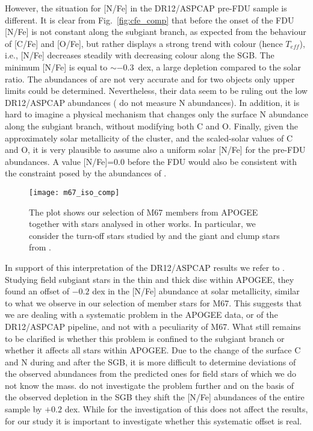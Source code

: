 \documentclass[a4paper,fleqn,usenatbib]{mnras}
\begin{document}
However, the situation for [N/Fe] in the DR12/ASPCAP pre-FDU sample is different. It is clear from Fig.~\ref{fig:cfe_comp} that before the onset of the FDU [N/Fe] is not constant along the subgiant branch, as expected from the behaviour of [C/Fe] and [O/Fe], 
but rather displays a strong trend with colour (hence $T_{eff}$), i.e., [N/Fe] decreases steadily with decreasing colour along the SGB. The minimum [N/Fe] is equal to $\sim-$0.3~dex, a large depletion compared to the solar ratio.
The abundances of \citet{shetrone2000} are not very accurate and for two objects only upper limits could be determined. Nevertheless,  their data seem to be ruling out the low DR12/ASPCAP abundances (\citealt{onehag2014} do not measure N abundances).
In addition, it is hard to imagine a physical mechanism that changes only the surface N abundance along the subgiant branch, without 
modifying both C and O.
Finally, given the approximately solar metallicity of the cluster, and the scaled-solar values of C and O, it is very plausible to assume 
also a uniform solar [N/Fe] for the pre-FDU abundances. A value [N/Fe]=0.0 before the FDU would also be consistent with the constraint posed by the abundances of \citet{shetrone2000}. 


\begin{figure}
	\texttt{[image: m67\_iso\_comp]}
	\caption{The plot shows our selection of M67 members from APOGEE together with stars analysed in other works. In particular, we consider the turn-off stars studied by \citet{shetrone2000} and the giant and clump stars from \citet{tautv2000}.}
	\label{fig:cn_iso_lit}
\end{figure}



In support of this interpretation of the DR12/ASPCAP results we refer to \citet{masseron2015}. Studying field subgiant stars in the thin and thick disc within APOGEE, they found an offset of $-0.2$ dex in the [N/Fe] abundance at solar metallicity, similar to what we observe in our selection of member stars for M67. 
This suggests that we are dealing with a systematic problem in the APOGEE data, or of the DR12/ASPCAP pipeline, and not with a peculiarity of M67. What still remains to be clarified is whether this problem is confined to the subgiant branch or whether it affects all stars within APOGEE. Due to the change of the surface C and N during and after the SGB, it is more difficult to determine deviations of the observed abundances from the predicted ones for field stars of which we do not know the mass. \citet{masseron2015} do not investigate the problem further and on the basis of the observed depletion in the SGB they shift the [N/Fe] abundances of the entire sample by $+0.2$ dex. 
While for the investigation of \citet{masseron2015} this does not affect the results, for our study it is important to
investigate whether this systematic offset is real.
\end{document}
